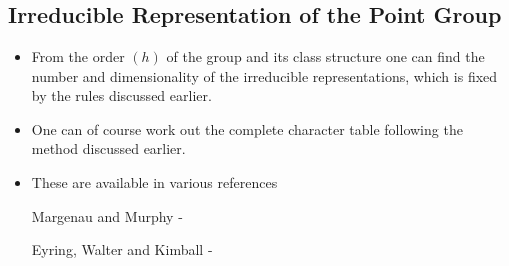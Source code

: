 \chapter[Lecture 12]{}\label{lec12}

\section*{Irreducible Representation of the Point Group}
\begin{itemize}
\item From the order $(h)$ of the group and its class structure one can find the number and dimensionality of the irreducible representations, which is fixed by the rules discussed earlier.

\item One can of course work out the complete character table following the method discussed earlier.

\item These are available in various references

Margenau and Murphy -

Eyring, Walter and Kimball -
\end{itemize}

